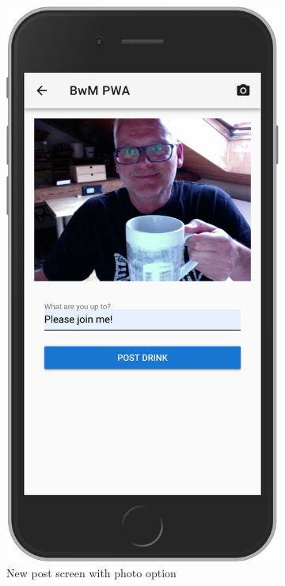 \begin{figure}
\begin{subfigure}{.5\textwidth}
    \includegraphics[width=.7\linewidth]{img/screen04}
    \caption{New post screen with photo option}
    \label{fig:sub1}
  \end{subfigure}%
  \begin{subfigure}{.5\textwidth}
    \centering

\end{subfigure}
\end{figure}

